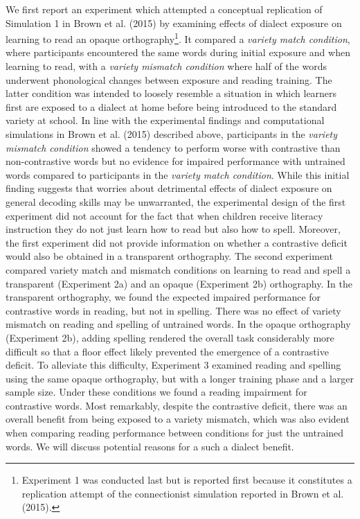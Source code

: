 \documentclass[doc,floatsintext]{apa6}
\let\rmarkdownfootnote\footnote%
\def\footnote{\protect\rmarkdownfootnote}
\begin{document}
We first report an experiment which attempted a conceptual replication
of Simulation 1 in Brown et al. (2015) by examining effects of dialect
exposure on learning to read an opaque orthography\footnote{Experiment 1
  was conducted last but is reported first because it constitutes a
  replication attempt of the connectionist simulation reported in Brown
  et al. (2015).}. It compared a \emph{variety match condition}, where
participants encountered the same words during initial exposure and when
learning to read, with a \emph{variety mismatch condition} where half of
the words underwent phonological changes between exposure and reading
training. The latter condition was intended to loosely resemble a
situation in which learners first are exposed to a dialect at home
before being introduced to the standard variety at school. In line with
the experimental findings and computational simulations in Brown et al.
(2015) described above, participants in the \emph{variety mismatch
condition} showed a tendency to perform worse with contrastive than
non-contrastive words but no evidence for impaired performance with
untrained words compared to participants in the \emph{variety match
condition}. While this initial finding suggests that worries about
detrimental effects of dialect exposure on general decoding skills may
be unwarranted, the experimental design of the first experiment did not
account for the fact that when children receive literacy instruction
they do not just learn how to read but also how to spell. Moreover, the
first experiment did not provide information on whether a contrastive
deficit would also be obtained in a transparent orthography. The second
experiment compared variety match and mismatch conditions on learning to
read and spell a transparent (Experiment 2a) and an opaque (Experiment
2b) orthography. In the transparent orthography, we found the expected
impaired performance for contrastive words in reading, but not in
spelling. There was no effect of variety mismatch on reading and
spelling of untrained words. In the opaque orthography (Experiment 2b),
adding spelling rendered the overall task considerably more difficult so
that a floor effect likely prevented the emergence of a contrastive
deficit. To alleviate this difficulty, Experiment 3 examined reading and
spelling using the same opaque orthography, but with a longer training
phase and a larger sample size. Under these conditions we found a
reading impairment for contrastive words. Most remarkably, despite the
contrastive deficit, there was an overall benefit from being exposed to
a variety mismatch, which was also evident when comparing reading
performance between conditions for just the untrained words. We will
discuss potential reasons for a such a dialect benefit.
\end{document}
